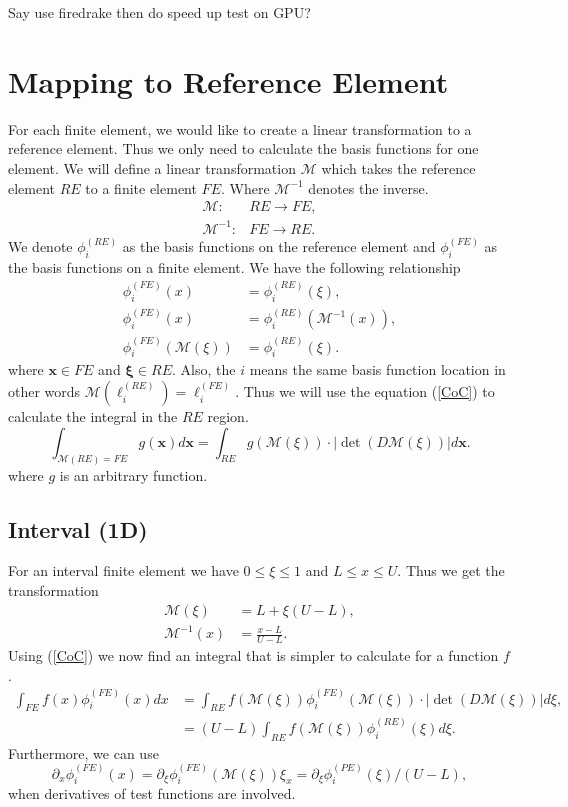 \documentclass[12pt]{ociamthesis}
\begin{document}
Say use firedrake then do speed up test on GPU?

\section{Mapping to Reference Element} \label{RE}
For each finite element, we would like to create a linear transformation to a reference element. Thus we only need to calculate the basis functions for one element. We will define a linear transformation $\mathcal{M}$ which takes the reference element $RE$ to a finite element $FE$. Where $\mathcal{M}^{-1}$ denotes the inverse. 
\begin{align}
\mathcal{M}: &RE \rightarrow FE, \\
\mathcal{M}^{-1}: &FE \rightarrow RE.
\end{align}
We denote $\phi_i^{(RE)}$ as the basis functions on the reference element and $\phi_i^{(FE)}$ as the basis functions on a finite element. We have the following relationship
\begin{align}
\phi_i^{(FE)}(x) &= \phi_i^{(RE)}(\xi), \\
\phi_i^{(FE)}(x) &= \phi_i^{(RE)}(\mathcal{M}^{-1}(x)), \\
\phi_i^{(FE)}(\mathcal{M}(\xi)) &= \phi_i^{(RE)}(\xi).
\end{align}
where $\mathbf{x} \in FE$ and $\mathbf{\xi} \in RE$. Also, the $i$ means the same basis function location in other words $\mathcal{M}(\ell_i^{(RE)}) = \ell_i^{(FE)}$. Thus we will use the equation (\ref{CoC}) to calculate the integral in the $RE$ region.
\begin{equation} \label{CoC}
\int_{\mathcal{M}(RE)=FE}g(\mathbf{x}) d\mathbf{x} =
\int_{RE}g(\mathcal{M(\xi)})\cdot |\det(D\mathcal{M}(\xi))| d\mathbf{x}.
\end{equation}
where $g$ is an arbitrary function.
\subsection{Interval (1D)}
For an interval finite element we have $0\leq\xi\leq1$ and $L \leq x \leq U$. Thus we get the transformation
\begin{align}
\mathcal{M}(\xi) &= L + \xi(U-L),\\
\mathcal{M}^{-1}(x) &= \frac{x-L}{U-L}.
\end{align}
Using (\ref{CoC}) we now find an integral that is simpler to calculate for a function $f$.
\begin{align}
\int_{FE} f(x)\phi_i^{(FE)}(x) dx &=
\int_{RE}f(\mathcal{M}(\xi))\phi_i^{(FE)}(\mathcal{M}(\xi))\cdot |\det(D\mathcal{M}(\xi))| d\xi, \\
&= (U-L) \int_{RE}f(\mathcal{M}(\xi)) \phi_i^{(RE)}(\xi) d\xi.
\end{align}
Furthermore, we can use 
\begin{equation}
\partial_x \phi_i^{(FE)}(x) =
\partial_{\xi}\phi_i^{(FE)}(\mathcal{M}(\xi)) \xi_x = 
\partial_{\xi}\phi_i^{(PE)}(\xi)/(U-L),
\end{equation}
when derivatives of test functions are involved.
\end{document}

